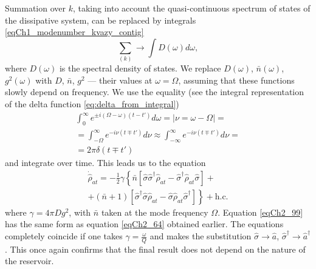 Summation over $k$, taking into account the quasi-continuous spectrum of states
of the dissipative system, can be replaced by integrals
\eqref{eqCh1_modenumber_kvazy_contig} 
\[
\sum_{(k)} \rightarrow \int D\left(\omega\right)d \omega,
\]  
where $D\left(\omega\right)$ is the spectral density of states. We replace
$D\left(\omega\right)$, $\bar{n}\left(\omega\right)$,
$g^2\left(\omega\right)$ with $D$, $\bar{n}$, $g^2$ — their values at
$\omega = \Omega$, assuming that these functions slowly   
depend on frequency. We use the equality (see
the integral representation of the delta function
\eqref{eq:delta_from_integral})
\begin{eqnarray}
\int_{0}^\infty
e^{\pm i\left(\Omega - \omega\right)
\left(t - t'\right)}d \omega = \left|\nu = \omega - \Omega\right| =
\nonumber \\
=
\int_{-\Omega}^\infty
e^{ - i \nu
\left(t \mp t'\right)}d \nu \approx
\int_{-\infty}^\infty
e^{ - i \nu
\left(t \mp t'\right)}d \nu = 
\nonumber \\
= 2 \pi \delta \left(t \mp t'\right) 
\label{eqCh2_98}
\end{eqnarray}
and integrate over time. This leads us to the equation 
\begin{eqnarray}
\dot{\hat{\rho}}_{at} = -\frac{1}{2}\gamma \left\{
\bar{n}\left[
\hat{\sigma}\hat{\sigma}^{\dag}\hat{\rho}_{at} -
\hat{\sigma}^{\dag}\hat{\rho}_{at}\hat{\sigma}
\right] +
\right.
\nonumber \\
+
\left.
\left(\bar{n} + 1\right)\left[
\hat{\sigma}^{\dag}\hat{\sigma}\hat{\rho}_{at} -
\hat{\sigma}\hat{\rho}_{at}\hat{\sigma}^{\dag}
\right]
\right\}
+ \mbox{h.c.}
\label{eqCh2_99}
\end{eqnarray}
where $\gamma =4 \pi D g^2$, with $\bar{n}$ taken at the mode frequency $\Omega$.
Equation \eqref{eqCh2_99} has the same form as equation
\eqref{eqCh2_64} obtained earlier. The equations 
completely coincide if one takes $\gamma = \frac{\omega}{Q}$ and
makes the substitution $\hat{\sigma} \rightarrow \hat{a}$, $\hat{\sigma}^{\dag}
\rightarrow \hat{a}^{\dag}$.  This once again confirms that the final
result does not depend on the nature of the reservoir.   

